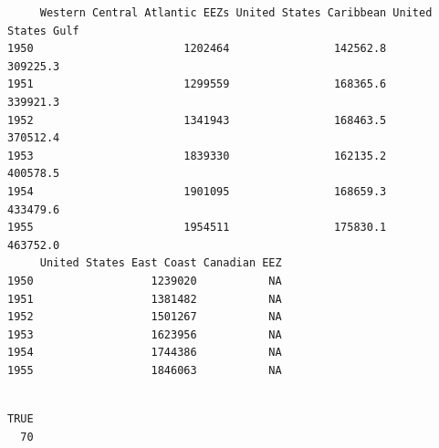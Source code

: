 \documentclass[
]{article}
\newenvironment{Shaded}{\begin{snugshade}}{\end{snugshade}}
\newcommand{\CommentTok}[1]{\textcolor[rgb]{0.37,0.37,0.37}{#1}}
\newcommand{\ConstantTok}[1]{\textcolor[rgb]{0.56,0.35,0.01}{#1}}
\newcommand{\DecValTok}[1]{\textcolor[rgb]{0.68,0.00,0.00}{#1}}
\newcommand{\FunctionTok}[1]{\textcolor[rgb]{0.28,0.35,0.67}{#1}}
\newcommand{\NormalTok}[1]{\textcolor[rgb]{0.00,0.23,0.31}{#1}}
\newcommand{\OtherTok}[1]{\textcolor[rgb]{0.00,0.23,0.31}{#1}}
\newcommand{\SpecialCharTok}[1]{\textcolor[rgb]{0.37,0.37,0.37}{#1}}
\begin{document}
\begin{verbatim}
     Western Central Atlantic EEZs United States Caribbean United States Gulf
1950                       1202464                142562.8           309225.3
1951                       1299559                168365.6           339921.3
1952                       1341943                168463.5           370512.4
1953                       1839330                162135.2           400578.5
1954                       1901095                168659.3           433479.6
1955                       1954511                175830.1           463752.0
     United States East Coast Canadian EEZ
1950                  1239020           NA
1951                  1381482           NA
1952                  1501267           NA
1953                  1623956           NA
1954                  1744386           NA
1955                  1846063           NA
\end{verbatim}

\begin{Shaded}
\end{Shaded}

\begin{verbatim}

TRUE 
  70 
\end{verbatim}

\begin{Shaded}
\end{Shaded}
\end{document}
